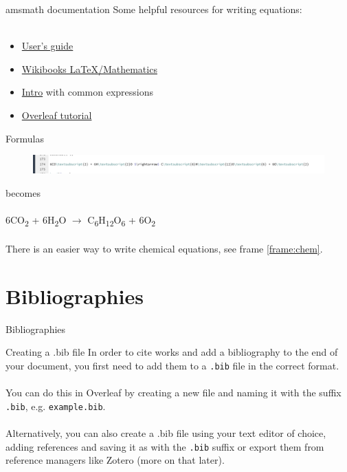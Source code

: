 \documentclass{beamer}
\begin{document}
\begin{frame}{amsmath documentation}
Some helpful resources for writing equations:\\~\\
\begin{itemize}
    \item \href{https://mirror.foobar.to/CTAN/macros/latex/required/amsmath/amsldoc.pdf}{User's guide}
    \item \href{https://en.wikibooks.org/wiki/LaTeX/Mathematics}{Wikibooks LaTeX/Mathematics} 
    \item \href{https://latex-tutorial.com/tutorials/amsmath/}{Intro} with common expressions
    \item \href{https://www.overleaf.com/learn/latex/Aligning_equations_with_amsmath}{Overleaf tutorial}
\end{itemize}
\end{frame}

\begin{frame}[fragile]{Formulas}
\begin{figure}
    \centering
    \includegraphics[width=\textwidth]{photosynth.png}
    \caption{}
    \label{fig:photosynth}
\end{figure}

becomes\\~\\

6CO\textsubscript{2} + 6H\textsubscript{2}O $\rightarrow$ C\textsubscript{6}H\textsubscript{12}O\textsubscript{6} + 6O\textsubscript{2}\\~\\
There is an easier way to write chemical equations, see frame \ref{frame:chem}.

\end{frame}

\section{Bibliographies}

\begin{frame}{}
\LARGE \centering Bibliographies    
\end{frame}

\begin{frame}[fragile]{Creating a .bib file} 
In order to cite works and add a bibliography to the end of your document, you first need to add them to a \verb|.bib| file in the correct format.\\~\\
\pause
You can do this in Overleaf by creating a new file and naming it with the suffix \verb|.bib|, e.g. \verb|example.bib|.\\~\\
\pause
Alternatively, you can also create a .bib file using your text editor of choice, adding references and saving it as with the \verb|.bib| suffix or export them from reference managers like Zotero (more on that later).
\end{frame}
\end{document}
